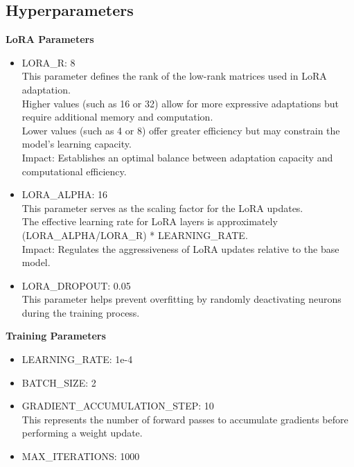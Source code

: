 \documentclass{cpsc202}
\begin{document}
    \subsection{Hyperparameters}
    \textbf{LoRA Parameters}
    \begin{itemize}
        \item LORA\_R: 8 \\
        This parameter defines the rank of the low-rank matrices used in LoRA adaptation. \\
        Higher values (such as 16 or 32) allow for more expressive adaptations but require additional memory and computation. \\
        Lower values (such as 4 or 8) offer greater efficiency but may constrain the model's learning capacity. \\
        Impact: Establishes an optimal balance between adaptation capacity and computational efficiency.
        \item LORA\_ALPHA: 16 \\
        This parameter serves as the scaling factor for the LoRA updates. \\
        The effective learning rate for LoRA layers is approximately (LORA\_ALPHA/LORA\_R) * LEARNING\_RATE.\\
        Impact: Regulates the aggressiveness of LoRA updates relative to the base model. \\
        \item LORA\_DROPOUT: 0.05 \\
        This parameter helps prevent overfitting by randomly deactivating neurons during the training process.
    \end{itemize}
    \textbf{Training Parameters}
    \begin{itemize}
        \item LEARNING\_RATE: 1e-4
        \item BATCH\_SIZE: 2
        \item GRADIENT\_ACCUMULATION\_STEP: 10 \\
        This represents the number of forward passes to accumulate gradients before performing a weight update.
        \item MAX\_ITERATIONS: 1000
    \end{itemize}

    \newpage
\end{document}
